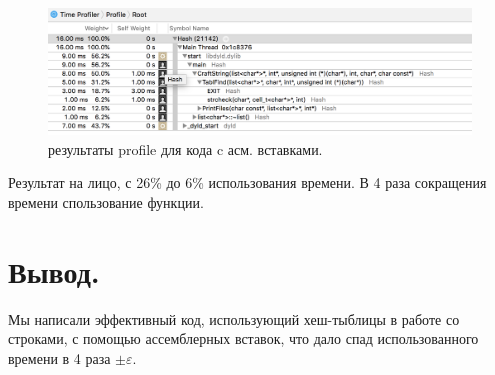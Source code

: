 \documentclass[a4paper,12pt]{article} %
\begin{document}
\begin{figure}[h!]
\begin{center}
\includegraphics[width=1\textwidth]{41}
\end{center}
\caption{результаты profile для кода c асм. вставками.} \label{dz2}
\end{figure}

Результат на лицо, с 26\% до 6\% использования времени. В 4 раза сокращения времени спользование функции.

\section{Вывод.}
Мы написали эффективный код, использующий хеш-тыблицы в работе со строками, с помощью ассемблерных вставок, что дало спад использованного времени в 4 раза $\pm \varepsilon$.\\
\end{document}
